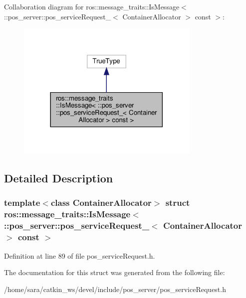 Collaboration diagram for ros\+:\+:message\+\_\+traits\+:\+:Is\+Message$<$ \+:\+:pos\+\_\+server\+:\+:pos\+\_\+service\+Request\+\_\+$<$ Container\+Allocator $>$ const $>$\+:
\nopagebreak
\begin{figure}[H]
\begin{center}
\leavevmode
\includegraphics[width=248pt]{structros_1_1message__traits_1_1IsMessage_3_01_1_1pos__server_1_1pos__serviceRequest___3_01Conta7d3a0c550b241f1a21282f0d568085ec}
\end{center}
\end{figure}


\subsection{Detailed Description}
\subsubsection*{template$<$class Container\+Allocator$>$\newline
struct ros\+::message\+\_\+traits\+::\+Is\+Message$<$ \+::pos\+\_\+server\+::pos\+\_\+service\+Request\+\_\+$<$ Container\+Allocator $>$ const $>$}



Definition at line 89 of file pos\+\_\+service\+Request.\+h.



The documentation for this struct was generated from the following file\+:\begin{DoxyCompactItemize}
\item 
/home/sara/catkin\+\_\+ws/devel/include/pos\+\_\+server/pos\+\_\+service\+Request.\+h\end{DoxyCompactItemize}

